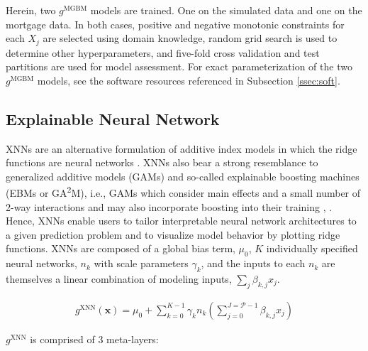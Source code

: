 \documentclass[information,article,submit,moreauthors,pdftex]{definitions/mdpi}
\begin{document}
Herein, two $g^\text{MGBM}$ models are trained.  One on the simulated data and one on the mortgage data. In both cases, positive and negative monotonic constraints for each $X_j$ are selected using domain knowledge, random grid search is used to determine other hyperparameters, and five-fold cross validation and test partitions are used for model assessment. For exact parameterization of the two $g^\text{MGBM}$ models, see the software resources referenced in Subsection \ref{ssec:soft}. 

\subsection{Explainable Neural Network}\label{ssec:xnn}

XNNs are an alternative formulation of additive index models in which the ridge functions are neural networks \cite{wf_xnn}. XNNs also bear a strong resemblance to generalized additive models (GAMs) and so-called explainable boosting machines (EBMs or GA\textsuperscript{2}M), i.e., GAMs which consider main effects and a small number of 2-way interactions and may also incorporate boosting into their training \cite{esl}, \cite{ga2m}.  Hence, XNNs enable users to tailor interpretable neural network architectures to a given prediction problem and to visualize model behavior by plotting ridge functions. XNNs are composed of a global bias term, $\mu_0$, $K$ individually specified neural networks, $n_k$ with scale parameters $\gamma_k$, and the inputs to each $n_k$ are themselves a linear combination of modeling inputs, $\sum_j\beta_{k,j}x_j$.

\begin{equation}
\begin{aligned}
\label{eq:xnn}
g^{\text{XNN}}(\mathbf{x}) = \mu_0 + \sum_{k=0}^{K-1}\gamma_k n_k(\sum^{J=\mathcal{P}-1}_{j=0}\beta_{k, j}x_j)
\end{aligned}
\end{equation}

\noindent $g^{\text{XNN}}$ is comprised of 3 meta-layers:
\end{document}
